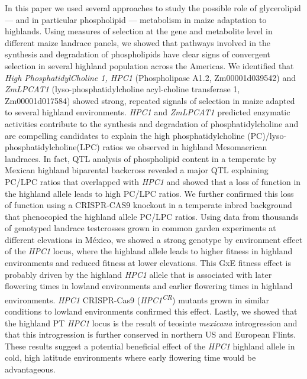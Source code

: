 \documentclass[9pt,twocolumn,twoside,lineno]{BioRxiv}
\begin{document}
In this paper we used several approaches to study the possible role of glycerolipid --- and in particular phospholipid --- metabolism in maize adaptation to highlands. 
Using measures of selection at the gene and metabolite level in different maize landrace panels, we showed that pathways involved in the synthesis and degradation of phospholipids have clear signs of convergent selection in several highland population across the Americas. 
We identified that \textit{High PhosphatidylCholine 1, HPC1} (Phospholipase A1.2, Zm00001d039542) and \textit{ZmLPCAT1} (lyso-phosphatidylcholine acyl-choline transferase 1, Zm00001d017584) showed strong, repeated signals of selection in maize adapted to several highland environments. 
\textit{HPC1} and \textit{ZmLPCAT1} predicted enzymatic activities contribute to the synthesis and degradation of phosphatidylcholine and are compelling candidates to explain the high phosphatidylcholine (PC)/lyso-phosphatidylcholine(LPC) ratios we observed in highland Mesomaerican landraces. 
In fact, QTL analysis of phospholipid content in a temperate by Mexican highland biparental backcross revealed a major QTL explaining PC/LPC ratios that overlapped with \textit{HPC1} and showed that a loss of function in the highland allele leads to high PC/LPC ratios. 
We further confirmed this loss of function using a CRISPR-CAS9 knockout in a temperate inbred background that phenocopied the highland allele PC/LPC ratios. 
Using data from thousands of genotyped landrace testcrosses grown in common garden experiments at different elevations in México, we showed a strong genotype by environment effect of the \textit{HPC1} locus, 
where the highland allele leads to higher fitness in highland environments and reduced fitness at lower elevations. 
This GxE fitness effect is probably driven by the highland \textit{HPC1} allele that is associated with later flowering times in lowland environments and earlier flowering times in highland environments. 
\textit{HPC1} CRISPR-Cas9 (\textit{HPC1\textsuperscript{CR}}) mutants grown in similar conditions to lowland environments confirmed this effect.
Lastly, we showed that the highland PT \textit{HPC1} locus is the result of teosinte \textit{mexicana} introgression and that this introgression is further conserved in northern US and European Flints. 
These results suggest a potential beneficial effect of the \textit{HPC1} highland allele in cold, high latitude environments where early flowering time would be advantageous.
\end{document}
